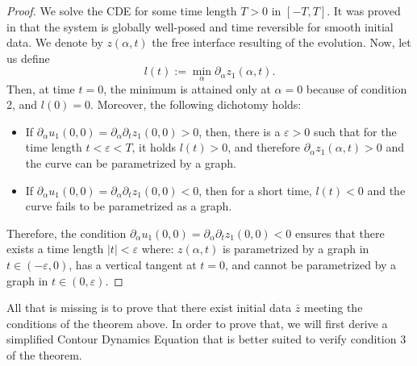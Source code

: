 \documentclass[11pt]{article}
\numberwithin{equation}{section}
\begin{document}
\begin{proof}
    We solve the CDE for some time length $T>0$ in $[-T,T]$. It was proved in \cite{GGS25} that the system is globally well-posed and time reversible for smooth initial data. We denote by $z(\alpha,t)$ the free interface resulting of the evolution. Now, let us define 
    \begin{equation*}
        l(t) := \min_\alpha \partial_\alpha z_1(\alpha,t).
    \end{equation*}
    Then, at time $t=0$, the minimum is attained only at $\alpha =0$ because of condition 2, and $l(0) = 0$. Moreover, the following dichotomy holds: 
    \begin{itemize}
        \item If $\partial_\alpha u_1(0,0) = \partial_\alpha \partial_t {z}_1(0,0) >0$, then, there is a $\varepsilon >0$ such that for the time length $t < \varepsilon < T$, it holds $l(t) >0$, and therefore $\partial_\alpha z_1(\alpha,t) >0$ and the curve can be parametrized by a graph. 
        \item If  $\partial_\alpha u_1(0,0) = \partial_\alpha \partial_t {z}_1(0,0) <0$, then for a short time, $l(t) <0$ and the curve fails to be parametrized as a graph.
    \end{itemize}
    Therefore, the condition $\partial_\alpha u_1(0,0) = \partial_\alpha \partial_t {z}_1(0,0) <0$ ensures that there exists a time length $|t|<\varepsilon$ where: $z(\alpha,t)$ is parametrized by a graph in $t \in (-\varepsilon,0)$, has a vertical tangent at $t = 0$, and cannot be parametrized by a graph in $t \in (0,\varepsilon)$.
\end{proof}

All that is missing is to prove that there exist initial data $\bar{z}$ meeting the conditions of the theorem above. In order to prove that, we will first derive a simplified Contour Dynamics Equation that is better suited to verify condition 3 of the theorem. 
\end{document}
